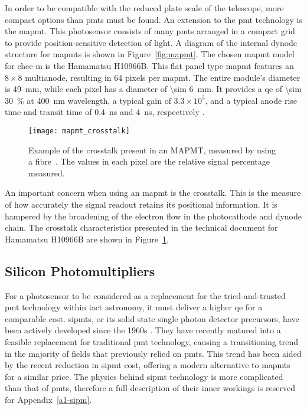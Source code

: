 In order to be compatible with the reduced plate scale of the telescope, more compact options than \glspl{pmt} must be found. An extension to the \gls{pmt} technology is the \gls{mapmt}. This photosensor consists of many \glspl{pmt} arranged in a compact grid to provide position-sensitive detection of light. A diagram of the internal dynode structure for \glspl{mapmt} is shown in Figure~\ref{fig:mapmt}. The chosen \gls{mapmt} model for \gls{chec-m} is the Hamamatsu H10966B. This flat panel type \gls{mapmt} features an $8 \times 8$ multianode, resulting in 64 pixels per \gls{mapmt}. The entire module's diameter is \SI{49}{mm}, while each pixel has a diameter of \SI{\sim 6}{mm}. It provides a \gls{qe} of \SI{\sim 30}{\percent} at \SI{400}{nm} wavelength, a typical gain of $3.3 \times 10^5$, and a typical anode rise time and transit time of \SI{0.4}{ns} and \SI{4}{ns}, respectively \cite{Hamamatsu2011}. 

\begin{figure}
	\centering
    \texttt{[image: mapmt\_crosstalk]} 
	\caption[Multi-Anode Photomultiplier Tube crosstalk.]{Example of the crosstalk present in an MAPMT, measured by using a fibre~\cite{Hamamatsu2011}. The values in each pixel are the relative signal percentage measured.}
	\label{fig:mapmt_crosstalk}
\end{figure}

An important concern when using an \gls{mapmt} is the crosstalk. This is the measure of how accurately the signal readout retains its positional information. It is hampered by the broadening of the electron flow in the photocathode and dynode chain. The crosstalk characteristics presented in the technical document for Hamamatsu H10966B are shown in Figure~\ref{fig:mapmt_crosstalk}.

\subsection{Silicon Photomultipliers}

For a photosensor to be considered as a replacement for the tried-and-trusted \gls{pmt} technology within \gls{iact} astronomy, it must deliver a higher \gls{qe} for a comparable cost. \glspl{sipmt}, or its solid state single photon detector precursors, have been actively developed since the 1960s \cite{Renker2006}. They have recently matured into a feasible replacement for traditional \gls{pmt} technology, causing a transitioning trend in the majority of fields that previously relied on \glspl{pmt}. This trend has been aided by the recent reduction in \gls{sipmt} cost, offering a modern alternative to \glspl{mapmt} for a similar price. The physics behind \gls{sipmt} technology is more complicated than that of \glspl{pmt}, therefore a full description of their inner workings is reserved for Appendix~\ref{a1-sipm}.

